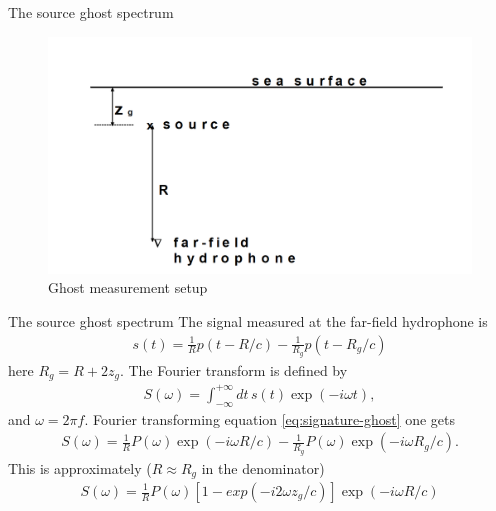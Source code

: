 \documentclass[xcolor=dvipsnames,notes]{beamer}
\begin{document}
\begin{frame}{The source ghost spectrum}
\begin{figure}
  \includegraphics[width=\textwidth]{Fig/ghost.png}
  \caption{Ghost measurement setup}
  \label{fig:ghost}
\end{figure}
\end{frame}
\begin{frame}{The source ghost spectrum}
The signal measured at the far-field hydrophone is
\begin{eqnarray}
s(t) = \frac{1}{R}p(t-R/c) - \frac{1}{R_g}p(t-R_g/c)
                                \label{eq:signature-ghost}
\end{eqnarray}
here $R_g = R + 2z_g$.
The Fourier transform is defined by
\begin{eqnarray}
 S(\omega) = \int_{-\infty}^{+\infty} dt\, s(t)\exp(-i\omega t),
\end{eqnarray}
and $\omega =2\pi f$.
Fourier transforming equation \eqref{eq:signature-ghost} one gets
\begin{eqnarray}
S(\omega) = 
  \frac{1}{R}P(\omega)\exp(-i\omega R/c) 
 - \frac{1}{R_g}P(\omega)\exp(-i\omega R_g/c).
\end{eqnarray}
This is approximately ($R\approx R_g$ in the denominator)
\begin{eqnarray}
S(\omega) = 
  \frac{1}{R}P(\omega)\left[1-exp(-i2\omega z_g/c)\right]\exp(-i\omega R/c) 
\end{eqnarray}
\end{frame}
\end{document}
